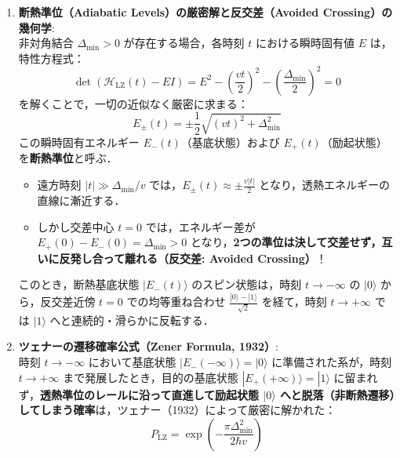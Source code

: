 \documentclass[11pt,a4paper,oneside,openany]{ltjsbook}
\theoremstyle{definition}
\theoremstyle{plain}
\theoremstyle{remark}
\newcommand{\ket}[1]{|#1\rangle}
\begin{document}
\begin{insightbox}
\begin{enumerate}[label=\textbf{(\arabic*)}, leftmargin=*]
    \newpage
    \item \textbf{断熱準位（Adiabatic Levels）の厳密解と反交差（Avoided Crossing）の幾何学}:\\
    非対角結合 $\Delta_{\min} > 0$ が存在する場合，各時刻 $t$ における瞬時固有値 $E$ は，特性方程式：
    \begin{equation}
        \det\left(\mathcal{H}_{\text{LZ}}(t) - E I\right) = E^2 - \left(\frac{v t}{2}\right)^2 - \left(\frac{\Delta_{\min}}{2}\right)^2 = 0
    \end{equation}
    を解くことで，一切の近似なく厳密に求まる：
    \begin{equation}
        E_\pm(t) = \pm \frac{1}{2} \sqrt{(v t)^2 + \Delta_{\min}^2}
    \end{equation}
    この瞬時固有エネルギー $E_-(t)$（基底状態）および $E_+(t)$（励起状態）を\textbf{断熱準位}と呼ぶ．
    \begin{itemize}
        \item 遠方時刻 $|t| \gg \Delta_{\min}/v$ では，$E_\pm(t) \approx \pm \frac{v|t|}{2}$ となり，透熱エネルギーの直線に漸近する．
        \item しかし交差中心 $t=0$ では，エネルギー差が $E_+(0) - E_-(0) = \Delta_{\min} > 0$ となり，\textbf{2つの準位は決して交差せず，互いに反発し合って離れる（反交差: Avoided Crossing）}！
    \end{itemize}
    このとき，断熱基底状態 $\ket{E_-(t)}$ のスピン状態は，時刻 $t \to -\infty$ の $\ket{0}$ から，反交差近傍 $t=0$ での均等重ね合わせ $\frac{\ket{0}-\ket{1}}{\sqrt{2}}$ を経て，時刻 $t \to +\infty$ では $\ket{1}$ へと連続的・滑らかに反転する．

    \item \textbf{ツェナーの遷移確率公式（Zener Formula, 1932）}:\\
    時刻 $t \to -\infty$ において基底状態 $\ket{E_-(-\infty)} = \ket{0}$ に準備された系が，時刻 $t \to +\infty$ まで発展したとき，目的の基底状態 $\ket{E_+(+\infty)} = \ket{1}$ に留まれず，\textbf{透熱準位のレールに沿って直進して励起状態 $\ket{0}$ へと脱落（非断熱遷移）してしまう確率}は，ツェナー（1932）によって厳密に解かれた：
    \begin{equation}
        P_{\text{LZ}} = \exp\left(-\frac{\pi \Delta_{\min}^2}{2\hbar v}\right)
    \end{equation}


\end{enumerate}
\end{insightbox}
\end{document}
